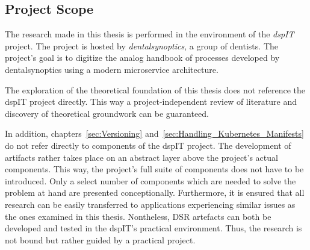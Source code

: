 
\subsection{Project Scope}%
\label{sub:Project_Scope}

The research made in this thesis is performed in the environment of the
\textit{dspIT} project. The project is hosted by \textit{dentalsynoptics}, a
group of dentists. The project's goal is to digitize the analog handbook of
processes developed by dentalsynoptics using a modern microservice
\autocite{HomepageDentalSynoptics2018} architecture.

The exploration of the theoretical foundation of this thesis does not reference
the dspIT project directly. This way a project-independent review of literature
and discovery of theoretical groundwork can be guaranteed.

In addition, chapters~\ref{sec:Versioning}
and~\ref{sec:Handling_Kubernetes_Manifests} do not refer directly to components
of the dspIT project. The development of artifacts rather takes place on an
abstract layer above the project's actual components. This way, the project's
full suite of components does not have to be introduced. Only a select number
of components which are needed to solve the problem at hand are presented
conceptionally. Furthermore, it is ensured that all research can be easily
transferred to applications experiencing similar issues as the ones examined in
this thesis. Nontheless, \ac{DSR} artefacts can both be developed and tested in
the dspIT's practical environment. Thus, the research is not bound but rather
guided by a practical project.
